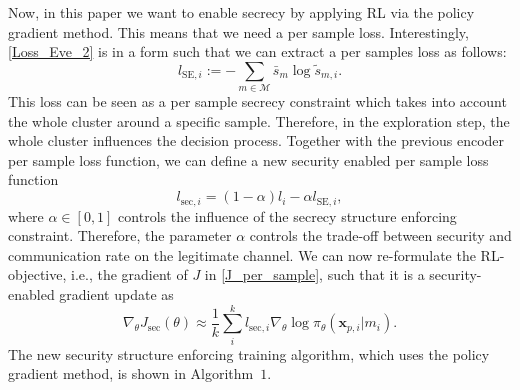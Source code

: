 \documentclass[conference, 10pt]{IEEEtran}
\begin{document}
Now, in this paper we want to enable secrecy by applying RL via the policy gradient method. This means that we need a per sample loss. Interestingly, \eqref{Loss_Eve_2} is in a form such that we can extract a per samples loss as follows:
 \begin{equation*}
     l_{\text{SE},i}:= -\sum_{m\in\mathcal{M}} \bar{s}_m \log \tilde{s}_{m,i}.
\label{Per_sample_loss_Eve}
 \end{equation*}
 This loss can be seen as a per sample secrecy constraint which takes into account the whole cluster around a specific sample. Therefore, in the exploration step, the whole cluster influences the decision process. Together with the previous encoder per sample loss function, we can define a new security enabled per sample loss function 
 \begin{equation}
    l_{\text{sec},i}=(1-\alpha) l_i-\alpha l_{\text{SE},i},
 \end{equation} where $\alpha\in [0,1]$ controls the influence of the secrecy structure enforcing constraint. Therefore, the parameter $\alpha$ controls the trade-off between security and communication rate on the legitimate channel.
We can now re-formulate the RL-objective, i.e., the gradient of $J$ in \eqref{J_per_sample}, such that it is a security-enabled gradient update as 
\begin{equation}
    \nabla_{\theta}J_{\text{sec}}(\theta)\approx \frac{1}{k}\sum_i^{k} l_{\text{sec},i} \nabla_{\theta}\log \pi_{\theta}(\mathbf{x}_{p,i}|m_i).
    \label{J_per_sample_sec}
\end{equation}  
 The new security structure enforcing training algorithm, which uses the policy gradient method, is shown in Algorithm~$1$.
\end{document}
